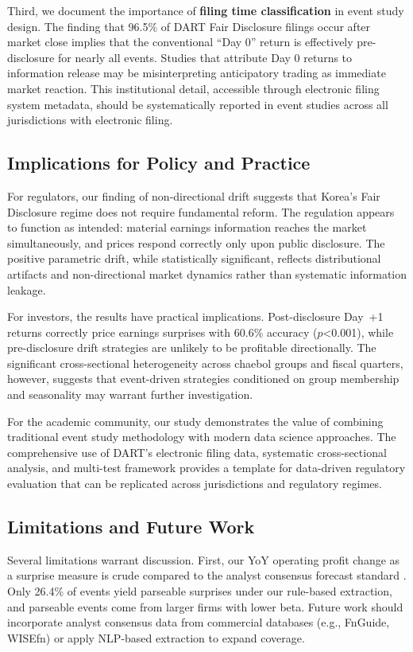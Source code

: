 \documentclass[manuscript,review]{acmart}
\begin{document}
Third, we document the importance of \textbf{filing time classification} in event study design. The finding that 96.5\% of DART Fair Disclosure filings occur after market close implies that the conventional ``Day 0'' return is effectively pre-disclosure for nearly all events. Studies that attribute Day 0 returns to information release may be misinterpreting anticipatory trading as immediate market reaction. This institutional detail, accessible through electronic filing system metadata, should be systematically reported in event studies across all jurisdictions with electronic filing.

\subsection{Implications for Policy and Practice}

For regulators, our finding of non-directional drift suggests that Korea's Fair Disclosure regime does not require fundamental reform. The regulation appears to function as intended: material earnings information reaches the market simultaneously, and prices respond correctly only upon public disclosure. The positive parametric drift, while statistically significant, reflects distributional artifacts and non-directional market dynamics rather than systematic information leakage.

For investors, the results have practical implications. Post-disclosure Day~+1 returns correctly price earnings surprises with 60.6\% accuracy ($p$<0.001), while pre-disclosure drift strategies are unlikely to be profitable directionally. The significant cross-sectional heterogeneity across chaebol groups and fiscal quarters, however, suggests that event-driven strategies conditioned on group membership and seasonality may warrant further investigation.

For the academic community, our study demonstrates the value of combining traditional event study methodology with modern data science approaches. The comprehensive use of DART's electronic filing data, systematic cross-sectional analysis, and multi-test framework provides a template for data-driven regulatory evaluation that can be replicated across jurisdictions and regulatory regimes.

\subsection{Limitations and Future Work}

Several limitations warrant discussion. First, our YoY operating profit change as a surprise measure is crude compared to the analyst consensus forecast standard \cite{livnat2006comparing}. Only 26.4\% of events yield parseable surprises under our rule-based extraction, and parseable events come from larger firms with lower beta. Future work should incorporate analyst consensus data from commercial databases (e.g., FnGuide, WISEfn) or apply NLP-based extraction to expand coverage.
\end{document}
